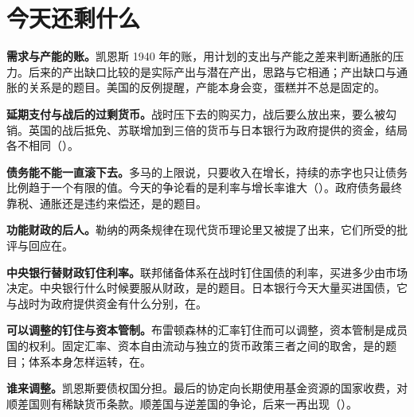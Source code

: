 \section{今天还剩什么}\label{sec:warfinance-legacy}

\textbf{需求与产能的账。}凯恩斯 1940 年的账，用计划的支出与产能之差来判断通胀的压力。后来的产出缺口比较的是实际产出与潜在产出，思路与它相通；产出缺口与通胀的关系是的题目。美国的反例提醒，产能本身会变，蛋糕并不总是固定的。

\textbf{延期支付与战后的过剩货币。}战时压下去的购买力，战后要么放出来，要么被勾销。英国的战后抵免、苏联增加到三倍的货币与日本银行为政府提供的资金，结局各不相同（）。

\textbf{债务能不能一直滚下去。}多马的上限说，只要收入在增长，持续的赤字也只让债务比例趋于一个有限的值。今天的争论看的是利率与增长率谁大（）。政府债务最终靠税、通胀还是违约来偿还，是的题目。

\textbf{功能财政的后人。}勒纳的两条规律在现代货币理论里又被提了出来，它们所受的批评与回应在。

\textbf{中央银行替财政钉住利率。}联邦储备体系在战时钉住国债的利率，买进多少由市场决定。中央银行什么时候要服从财政，是的题目。日本银行今天大量买进国债，它与战时为政府提供资金有什么分别，在。

\textbf{可以调整的钉住与资本管制。}布雷顿森林的汇率钉住而可以调整，资本管制是成员国的权利。固定汇率、资本自由流动与独立的货币政策三者之间的取舍，是的题目；体系本身怎样运转，在。

\textbf{谁来调整。}凯恩斯要债权国分担。最后的协定向长期使用基金资源的国家收费，对顺差国则有稀缺货币条款。顺差国与逆差国的争论，后来一再出现（）。

